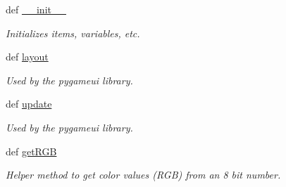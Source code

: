 \begin{DoxyCompactItemize}
def \hyperlink{classsimplegui_1_1_main_scene_a1771d66ba1c6fdb7f2b3c04f4173a9e3}{\-\_\-\-\_\-init\-\_\-\-\_\-}
\begin{DoxyCompactList}\small\item\em Initializes items, variables, etc. \end{DoxyCompactList}\item 
def \hyperlink{classsimplegui_1_1_main_scene_a82073a2b7ed88995f266a06b7f9ec6be}{layout}
\begin{DoxyCompactList}\small\item\em Used by the pygameui library. \end{DoxyCompactList}\item 
def \hyperlink{classsimplegui_1_1_main_scene_abe88eb59c38cba1d558fb8bcc672e929}{update}
\begin{DoxyCompactList}\small\item\em Used by the pygameui library. \end{DoxyCompactList}\item 
def \hyperlink{classsimplegui_1_1_main_scene_a68319a096ea4237e209e861005e1aaf7}{get\-R\-G\-B}
\begin{DoxyCompactList}\small\item\em Helper method to get color values (R\-G\-B) from an 8 bit number. \end{DoxyCompactList}\end{DoxyCompactItemize}
